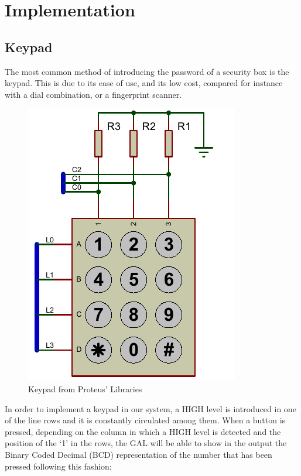 \section{Implementation}
\subsection{Keypad}
\label{sec:KEYPAD}

The most common method of introducing the password of a security box is the keypad. This is due to its ease of use, and its low cost, compared for instance with a dial combination, or a fingerprint scanner.
\medskip

\begin{figure}[H]
    \centering
    \includegraphics[scale = 0.8]{Graphics/KEYPAD/KEYPAD.PDF}
    \caption{Keypad from Proteus' Libraries}
    \label{fig:KEYPAD}
\end{figure}


In order to implement a keypad in our system, a HIGH level is introduced in one of the line rows and it is constantly circulated among them. When a button is pressed, depending on the column in which a HIGH level is detected and the position of the ‘1’ in the rows, the GAL will be able to show in the output the Binary Coded Decimal (BCD) representation of the number that has been pressed following this fashion:

